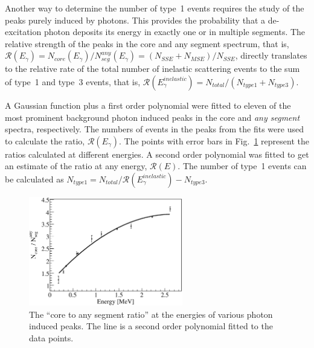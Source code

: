 Another way to determine the number of type~1 events requires the
study of the peaks purely induced by photons. This provides the
probability that a de-excitation photon deposits its energy in exactly
one or in multiple segments. The relative strength of the peaks in the
core and any segment spectrum, that is, $\mathcal{R}(E_{\gamma}) =
N_{core}(E_{\gamma}) / N^{any}_{seg}(E_{\gamma}) = (N_{SSE} + N_{MSE})
/ N_{SSE}$, directly translates to the relative rate of the total
number of inelastic scattering events to the sum of type~1 and type~3
events, that is, $\mathcal{R}(E_{\gamma}^{inelastic}) = N_{total} /
(N_{type1} + N_{type3})$.

A Gaussian function plus a first order polynomial were fitted to
eleven of the most prominent background photon induced peaks in the
core and \emph{any segment} spectra, respectively. The numbers of
events in the peaks from the fits were used to calculate the ratio,
$\mathcal{R}(E_{\gamma})$. The points with error bars in
Fig.~\ref{fig:neu:sf} represent the ratios calculated at different
energies. A second order polynomial was fitted to get an estimate of
the ratio at any energy, $\mathcal{R}(E)$. The number of type~1 events
can be calculated as $N_{type1} = N_{total} /
\mathcal{R}(E_{\gamma}^{inelastic}) - N_{type3}$.

\begin{figure}[tbhp]
  \centering
  \includegraphics[width=0.6\textwidth,clip]{sf}
  \caption{The ``core to any segment ratio'' at the energies of various photon induced peaks. The line is a second order polynomial fitted to the data points.}
  \label{fig:neu:sf}
\end{figure}

